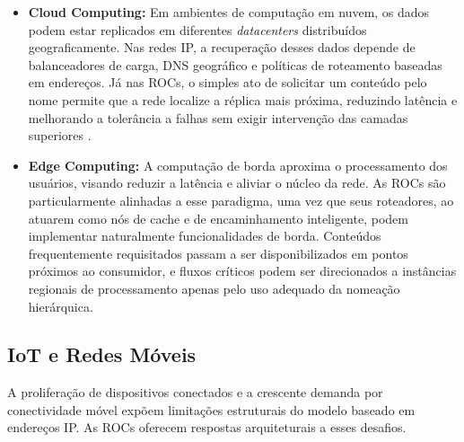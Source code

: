 \documentclass[12pt]{article}
\begin{document}
\begin{itemize}

\item \textbf{Cloud Computing:}
Em ambientes de computação em nuvem, os dados podem estar replicados em diferentes \textit{datacenters} distribuídos geograficamente. Nas redes IP, a recuperação desses dados depende de balanceadores de carga, DNS geográfico e políticas de roteamento baseadas em endereços. Já nas ROCs, o simples ato de solicitar um conteúdo pelo nome permite que a rede localize a réplica mais próxima, reduzindo latência e melhorando a tolerância a falhas sem exigir intervenção das camadas superiores \cite{ambiel2013redes}.

\item \textbf{Edge Computing:}
A computação de borda aproxima o processamento dos usuários, visando reduzir a latência e aliviar o núcleo da rede. As ROCs são particularmente alinhadas a esse paradigma, uma vez que seus roteadores, ao atuarem como nós de cache e de encaminhamento inteligente, podem implementar naturalmente funcionalidades de borda. Conteúdos frequentemente requisitados passam a ser disponibilizados em pontos próximos ao consumidor, e fluxos críticos podem ser direcionados a instâncias regionais de processamento apenas pelo uso adequado da nomeação hierárquica.

\end{itemize}

\subsection{IoT e Redes Móveis}

A proliferação de dispositivos conectados e a crescente demanda por conectividade móvel expõem limitações estruturais do modelo baseado em endereços IP. As ROCs oferecem respostas arquiteturais a esses desafios.
\end{document}
